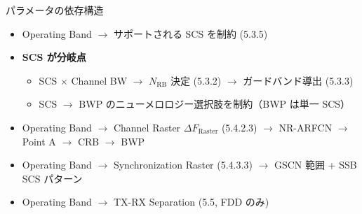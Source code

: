 \begin{frame}{パラメータの依存構造}
\begin{itemize}
  \item Operating Band $\to$ サポートされる SCS を制約 (5.3.5)
  \item \textbf{SCS が分岐点}
    \begin{itemize}
      \item SCS $\times$ Channel BW $\to$ $N_{\mathrm{RB}}$ 決定 (5.3.2) $\to$ ガードバンド導出 (5.3.3)
      \item SCS $\to$ BWP のニューメロロジー選択肢を制約（BWP は単一 SCS）
    \end{itemize}
  \item Operating Band $\to$ Channel Raster $\Delta F_{\mathrm{Raster}}$ (5.4.2.3) $\to$ NR-ARFCN $\to$ Point A $\to$ CRB $\to$ BWP
  \item Operating Band $\to$ Synchronization Raster (5.4.3.3) $\to$ GSCN 範囲 + SSB SCS パターン
  \item Operating Band $\to$ TX-RX Separation (5.5, FDD のみ)
\end{itemize}
\end{frame}
